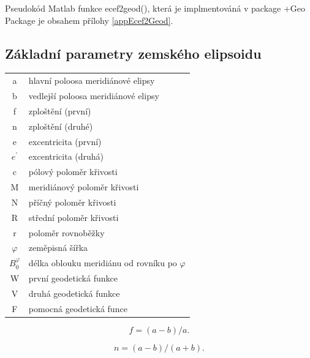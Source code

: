 \documentclass[11pt,a4paper]{article}
\begin{document}
Pseudokód Matlab funkce ecef2geod(), která je implmentováná v package +Geo Package je obsahem přílohy \ref{appEcef2Geod}.









 








\newpage
\begin{appendices}

\section{Základní parametry zemského elipsoidu} \label{appRefEll}

\begin{table}[ht!]
\begin{tabular}{c l}

a & hlavní poloosa meridiánové elipsy \\
b & vedlejší poloosa meridiánové elipsy\\
f & zploštění (první)\\
n & zploštění (druhé)\\
e & excentricita (první)\\
$e^{'}$ & excentricita (druhá)\\
c & pólový poloměr křivosti\\
M & meridiánový poloměr křivosti\\
N & příčný poloměr křivosti\\
R & střední poloměr křivosti\\
r & poloměr rovnoběžky\\
$\varphi$ & zeměpisná šířka\\
$B_{0}^{\varphi}$ & délka oblouku meridiánu od rovníku po $\varphi$ \\
W & první geodetická funkce\\
V & druhá geodetická funkce\\
F & pomocná geodetická funce\\      
\end{tabular}
\end{table}

\begin{equation}
f = (a-b)/a.
\end{equation}

\begin{equation}
n = (a-b)/(a+b).
\end{equation}


\end{appendices}
\end{document}
